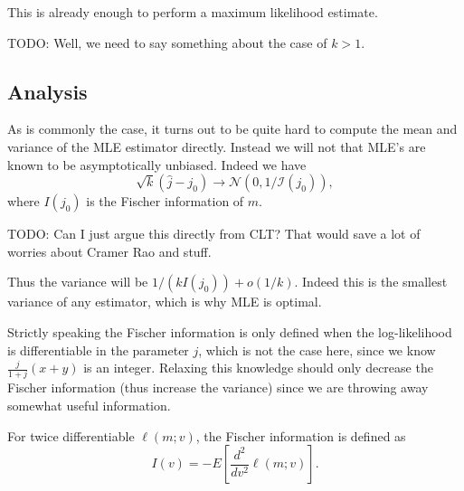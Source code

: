 This is already enough to perform a maximum likelihood estimate.

TODO: Well, we need to say something about the case of $k>1$.



\subsection{Analysis}

As is commonly the case, it turns out to be quite hard to compute the mean and variance of the MLE estimator directly.
Instead we will not that MLE's are known to be asymptotically unbiased.
Indeed we have
\[
   \sqrt{k}(\hat j - j_0) \to \mathcal N(0, 1/\mathcal I(j_0)),
\]
where $I(j_0)$ is the Fischer information of $m$.

TODO: Can I just argue this directly from CLT? That would save a lot of worries about Cramer Rao and stuff.

Thus the variance will be $1/(k I(j_0)) + o(1/k)$.
Indeed this is the smallest variance of any estimator, which is why MLE is optimal.

Strictly speaking the Fischer information is only defined when the log-likelihood is differentiable in the parameter $j$, which is not the case here, since we know $\frac{j}{1+j}(x+y)$ is an integer.
Relaxing this knowledge should only decrease the Fischer information (thus increase the variance) since we are throwing away somewhat useful information.

For twice differentiable $\ell(m;v)$,
the Fischer information is defined as
\[
   I(v) = -E[\frac{d^2}{dv^2}\ell(m;v)].
\]


